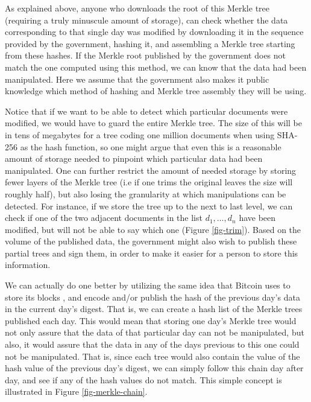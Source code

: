 As explained above, anyone who downloads the root of this Merkle tree (requiring a truly minuscule amount of storage), can check whether the data corresponding to that single day was modified by downloading it in the sequence provided by the government, hashing it, and assembling a Merkle tree starting from these hashes. If the Merkle root published by the government does not match the one computed using this method, we can know that the data had been manipulated. Here we assume that the government also makes it public knowledge which method of hashing and Merkle tree assembly they will be using. 

Notice that if we want to be able to detect which particular documents were modified, we would have to guard the entire Merkle tree. The size of this will be in tens of megabytes for a tree coding one million documents when using SHA-256 as the hash function, so one might argue that even this is a reasonable amount of storage needed to pinpoint which particular data had been manipulated. One can further restrict the amount of needed storage by storing fewer layers of the Merkle tree (i.e if one trims the original leaves the size will roughly half), but also losing the granularity at which manipulations can be detected. For instance, if we store the tree up to the next to last level, we can check if one of the two adjacent documents in the list $d_1,\ldots ,d_n$ have been modified, but will not be able to say which one (Figure \ref{fig-trim}). Based on the volume of the published data, the government might also wish to publish these partial trees and sign them, in order to make it easier for a person to store this information.

We can actually do one better by utilizing the same idea that Bitcoin uses to store its blocks \cite{whitepaper}, and encode and/or publish the hash of the previous day's data in the current day's digest. That is, we can create a hash list of the Merkle trees published each day. This would mean that storing one day's Merkle tree would not only assure that the data of that particular day can not be manipulated, but also, it would assure that the data in any of the days previous to this one could not be manipulated.  That is, since each tree would also contain the value of the hash value of the previous day's digest, we can simply follow this chain day after day, and see if any of the hash values do not match. This simple concept is illustrated in Figure \ref{fig-merkle-chain}.


\medskip
{} 


